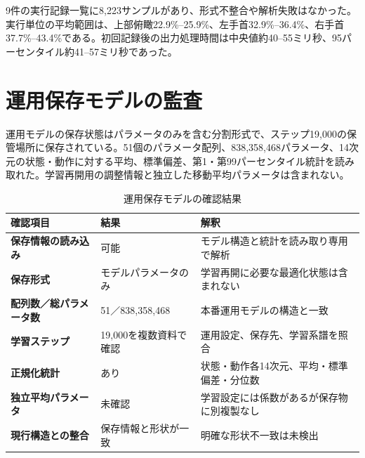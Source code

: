 
9件の実行記録一覧に8,223サンプルがあり、形式不整合や解析失敗はなかった。実行単位の平均範囲は、上部俯瞰22.9\%--25.9\%、左手首32.9\%--36.4\%、右手首37.7\%--43.4\%である。初回記録後の出力処理時間は中央値約40--55ミリ秒、95パーセンタイル約41--57ミリ秒であった。


\section{運用保存モデルの監査}

運用モデルの保存状態はパラメータのみを含む分割形式で、ステップ19,000の保管場所に保存されている。51個のパラメータ配列、838,358,468パラメータ、14次元の状態・動作に対する平均、標準偏差、第1・第99パーセンタイル統計を読み取れた。学習再開用の調整情報と独立した移動平均パラメータは含まれない。

\begin{table}[H]
\centering
\caption{運用保存モデルの確認結果}
\begin{tabularx}{\textwidth}{>{\bfseries}p{41mm}p{31mm}X}
\toprule
確認項目 & 結果 & 解釈\\
\midrule
保存情報の読み込み & 可能 & モデル構造と統計を読み取り専用で解析\\
保存形式 & モデルパラメータのみ & 学習再開に必要な最適化状態は含まれない\\
配列数／総パラメータ数 & 51／838,358,468 & 本番運用モデルの構造と一致\\
学習ステップ & 19,000を複数資料で確認 & 運用設定、保存先、学習系譜を照合\\
正規化統計 & あり & 状態・動作各14次元、平均・標準偏差・分位数\\
独立平均パラメータ & 未確認 & 学習設定には係数があるが保存物に別複製なし\\
現行構造との整合 & 保存情報と形状が一致 & 明確な形状不一致は未検出\\
\bottomrule
\end{tabularx}
\end{table}
